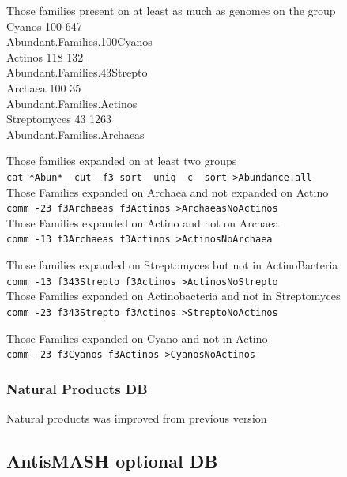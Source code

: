 \documentclass[12pt,twoside]{reedthesis}
\begin{document}
  Those families present on at least as much as genomes on the group\\
  Cyanos 100 647\\
  Abundant.Families.100Cyanos\\
  Actinos 118 132\\
  Abundant.Families.43Strepto\\
  Archaea 100 35\\
  Abundant.Families.Actinos\\
  Streptomyces 43 1263\\
  Abundant.Families.Archaeas
  
  Those families expanded on at least two groups\\
  \texttt{cat\ *Abun*\ \textbar{}\ cut\ -f3\textbar{}\ sort\ \textbar{}\ uniq\ -c\ \textbar{}\ sort\ \textgreater{}Abundance.all}\\
  
  Those Families expanded on Archaea and not expanded on Actino\\
  \texttt{comm\ -23\ f3Archaeas\ f3Actinos\ \textgreater{}ArchaeasNoActinos}\\
  Those Families expanded on Actino and not on Archaea\\
  \texttt{comm\ -13\ f3Archaeas\ f3Actinos\ \textgreater{}ActinosNoArchaea}
  
  Those families expanded on Streptomyces but not in ActinoBacteria\\
  \texttt{comm\ -13\ f343Strepto\ f3Actinos\ \textgreater{}ActinosNoStrepto}\\
  Those Families expanded on Actinobacteria and not in Streptomyces\\
  \texttt{comm\ -23\ f343Strepto\ f3Actinos\ \textgreater{}StreptoNoActinos}
  
  Those Families expanded on Cyano and not in Actino\\
  \texttt{comm\ -23\ f3Cyanos\ f3Actinos\ \textgreater{}CyanosNoActinos}
  
  \subsubsection{Natural Products DB}\label{natural-products-db}
  
  Natural products was improved from previous version
  
  \subsection{AntisMASH optional DB}\label{antismash-optional-db}
  
\end{document}
